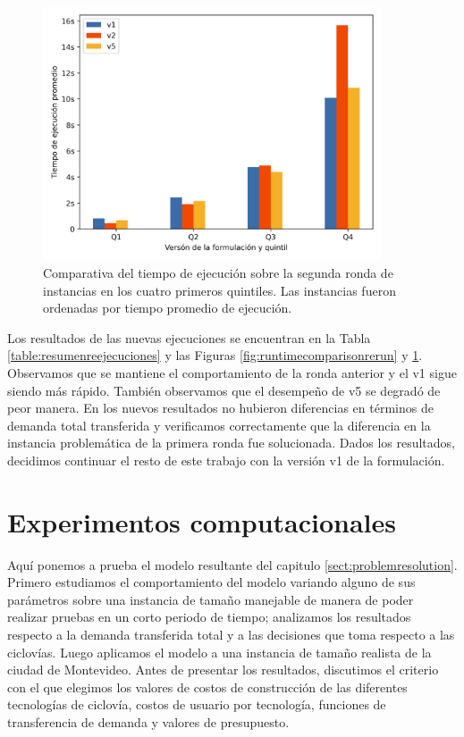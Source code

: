 \documentclass{article}
\begin{document}
  \begin{figure}[h!]
    \centering
    \includegraphics[width=10cm]{../resources/run_time_comparsion_by_quintile_rerun.png}
    \caption{Comparativa del tiempo de ejecución sobre la segunda ronda de instancias en los cuatro primeros quintiles. Las instancias fueron ordenadas por tiempo promedio de ejecución.} \label{fig:firstfourquintilesrerun}
  \end{figure}

  Los resultados de las nuevas ejecuciones se encuentran en la Tabla \ref{table:resumenreejecuciones} y las Figuras \ref{fig:runtimecomparisonrerun} y \ref{fig:firstfourquintilesrerun}. Observamos que se mantiene el comportamiento de la ronda anterior y el v1 sigue siendo más rápido. También observamos que el desempeño de v5 se degradó de peor manera. En los nuevos resultados no hubieron diferencias en términos de demanda total transferida y verificamos correctamente que la diferencia en la instancia problemática de la primera ronda fue solucionada. Dados los resultados, decidimos continuar el resto de este trabajo con la versión v1 de la formulación.

  \section{Experimentos computacionales}
  \label{sect:problemresults}

  Aquí ponemos a prueba el modelo resultante del capitulo \ref{sect:problemresolution}. Primero estudiamos el comportamiento del modelo variando alguno de sus parámetros sobre una instancia de tamaño manejable de manera de poder realizar pruebas en un corto periodo de tiempo; analizamos los resultados respecto a la demanda transferida total y a las decisiones que toma respecto a las ciclovías. Luego aplicamos el modelo a una instancia de tamaño realista de la ciudad de Montevideo. Antes de presentar los resultados, discutimos el criterio con el que elegimos los valores de costos de construcción de las diferentes tecnologías de ciclovía, costos de usuario por tecnología, funciones de transferencia de demanda y valores de presupuesto.
\end{document}
